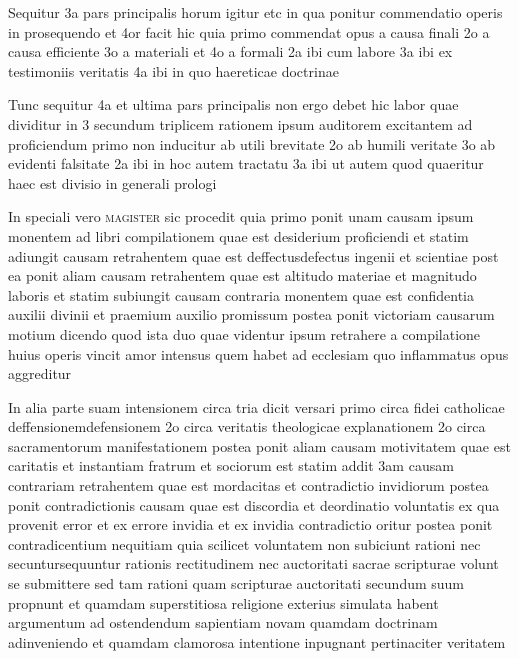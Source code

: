 \documentclass[twoside, openright]{article}
\newcommand{\name}[1]{\textsc{#1}}
\begin{document}
        \pstart
        Sequitur 3a pars principalis horum igitur etc in qua ponitur commendatio operis in prosequendo et 4or facit hic quia primo commendat opus a causa finali 2o a causa efficiente 3o a materiali et 4o a formali 2a ibi cum labore 3a ibi ex testimoniis veritatis 4a ibi in quo haereticae doctrinae
        \pend
     
        \pstart
        Tunc sequitur 4a et ultima pars principalis non ergo debet hic labor quae dividitur in 3 secundum triplicem rationem ipsum auditorem excitantem ad proficiendum primo non inducitur ab utili brevitate 2o ab humili veritate 3o ab evidenti falsitate 2a ibi in hoc autem tractatu 3a ibi ut autem quod quaeritur haec est divisio in generali prologi
        \pend
     
        \pstart
        In speciali vero \name{magister} sic procedit quia primo ponit unam causam ipsum monentem ad libri compilationem quae est desiderium proficiendi et statim adiungit causam retrahentem quae est deffectusdefectus ingenii et scientiae  post ea ponit aliam causam retrahentem quae est altitudo materiae et magnitudo laboris et statim subiungit causam contraria monentem quae est confidentia auxilii divinii et praemium auxilio promissum postea ponit victoriam causarum motium dicendo quod ista duo quae videntur ipsum retrahere a compilatione huius operis vincit amor intensus quem habet ad ecclesiam quo inflammatus opus aggreditur
        \pend
     
        \pstart
        In alia parte suam intensionem circa tria dicit versari primo circa fidei catholicae deffensionemdefensionem  2o circa veritatis theologicae explanationem 2o circa sacramentorum manifestationem  postea ponit aliam causam motivitatem quae est caritatis  et instantiam fratrum et sociorum est statim addit 3am causam contrariam retrahentem quae est mordacitas et contradictio invidiorum  postea ponit contradictionis causam quae est discordia et deordinatio voluntatis ex qua provenit error et ex errore invidia et ex invidia contradictio oritur  postea ponit contradicentium nequitiam quia scilicet voluntatem non subiciunt rationi nec secuntursequuntur rationis rectitudinem nec auctoritati sacrae scripturae volunt se submittere sed tam rationi quam scripturae auctoritati secundum suum propnunt et quamdam superstitiosa religione exterius simulata habent argumentum ad ostendendum sapientiam novam quamdam doctrinam adinveniendo et quamdam clamorosa intentione inpugnant pertinaciter veritatem
        \pend
     
\end{document}
